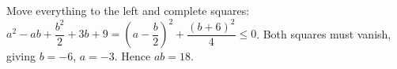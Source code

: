 Move everything to the left and complete squares: $a^2-ab+\dfrac{b^2}{2}+3b+9=(a-\dfrac{b}{2})^2+\dfrac{(b+6)^2}{4}\le0$. Both squares must vanish, giving $b=-6$, $a=-3$. Hence $\boxed{ab=18}$.
